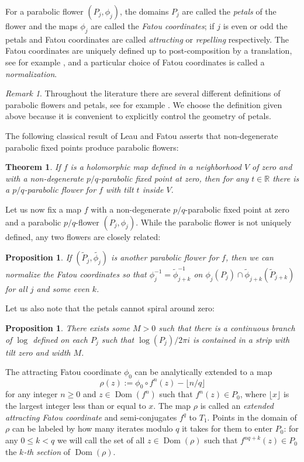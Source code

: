 \documentclass[12pt,letterpaper]{amsart}
\numberwithin{equation}{section}
\newtheorem{prop}[equation]{Proposition}
\newtheorem{theorem}[equation]{Theorem}
\theoremstyle{remark}
\newtheorem{remark}[equation]{Remark}
\theoremstyle{definition}
\newcommand{\R}{\mathbb R}
\DeclareMathOperator{\Dom}{Dom}
\begin{document}
For a parabolic flower $(P_j, \phi_j)$, the domains $P_j$ are called the \textit{petals} of the flower and the maps $\phi_j$ are called the \textit{Fatou coordinates}; if $j$ is even or odd the petals and Fatou coordinates are called \textit{attracting} or \textit{repelling} respectively.
The Fatou coordinates are uniquely defined up to post-composition by a translation, see for example \cite[Theorem 10.9]{Milnor}, and a particular choice of Fatou coordinates is called a \textit{normalization}. 


\begin{remark}
	Throughout the literature there are several different definitions of parabolic flowers and petals, see for example \cite[Chapter 10]{Milnor}. We choose the definition given above because it is convenient to explicitly control the geometry of petals.
\end{remark}


The following classical result of Leau \cite{leau} and Fatou \cite{fatou_flower} asserts that non-degenerate parabolic fixed points produce parabolic flowers:

\begin{theorem}\label{flower}
	If $f$ is a holomorphic map defined in a neighborhood $V$ of zero and with a non-degenerate $p/q$-parabolic fixed point at zero, then for any $t\in \R$ there is a $p/q$-parabolic flower for $f$ with tilt $t$ inside $V$.
\end{theorem}

Let us now fix a map $f$ with a non-degenerate $p/q$-parabolic fixed point at zero and a parabolic $p/q$-flower $(P_j, \phi_j)$.
While the parabolic flower is not uniquely defined, any two flowers are closely related:
\begin{prop}\label{prop:petals}
	If $(\tilde{P}_j, \tilde{\phi_j})$ is another parabolic flower for $f$, then we can normalize the Fatou coordinates so that  $\phi_j^{-1}= \tilde \phi_{j+k}^{-1} $ on $\phi_j(P_j)\cap \tilde \phi_{j+k}(\tilde P_{j+k}) $ for all $j$ and some even $k$.
\end{prop}
Let us also note that the petals cannot spiral around zero:
\begin{prop}\label{no spiral}
	There exists some $M>0$ such that there is a continuous branch of $\log$ defined on each $P_j$ such that $\log(P_j)/2\pi i$ is contained in a strip with tilt zero and width $M$. 
\end{prop}


 
	The attracting Fatou coordinate $\phi_0$ can be analytically extended to a map 
	$$\rho(z) := \phi_{0}\circ f^{n}(z)-\lfloor n/q\rfloor$$
	for any integer $n\geq 0$ and $z\in \Dom(f^{n})$ such that $f^{n}(z)\in P_{0}$, where $\lfloor x \rfloor$ is the largest integer less than or equal to $ x$. 
	The map $\rho$ is called an \textit{extended attracting Fatou coordinate} and semi-conjugates $f^q$ to $T_1$.	
	Points in the domain of $\rho$ can be labeled by how many iterates modulo $q$ it takes for them to enter $P_0$: for any $0\leq k < q$ we will call the set of all $z\in \Dom(\rho)$ such that $f^{nq+k}(z)\in P_0$ the \textit{$k$-th section} of $\Dom(\rho)$.  
	
\end{document}

